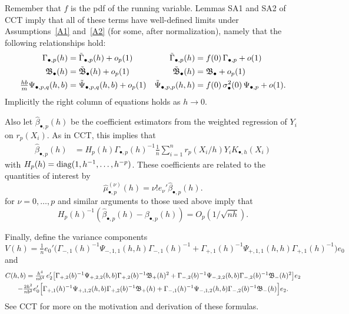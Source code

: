 \documentclass[12pt,fleqn]{article}
\begin{document}
Remember that $f$ is the pdf of the running variable. Lemmas
SA1 and SA2 of CCT imply that all of these terms have well-defined limits under
Assumptions~\ref{A1} and~\ref{A2} (for some, after normalization), namely that
the following relationships hold:
\begin{align}
  \Gamma_{\bullet,p}(h) & = \tilde{\Gamma}_{\bullet,p}(h) + o_p(1) &
  \tilde{\Gamma}_{\bullet,p}(h) &= f(0) \, \Gamma_{\bullet,p} + o(1) \label{eq:10} \\
  \mathfrak{B}_{\bullet}(h) &= \tilde{\mathfrak{B}}_{\bullet}(h) + o_p(1) &
  \tilde{\mathfrak{B}}_{\bullet}(h) &= \mathfrak{B}_{\bullet} + o_p(1) \label{eq:11} \\
  \tfrac{hb}{m} \Psi_{\bullet,p,q}(h, b) &= \tilde{\Psi}_{\bullet,p,q}(h,b) + o_p(1) &
  \tilde{\Psi}_{\bullet,p,p}(h,h) &= f(0) \, \sigma^2_{\bullet}(0) \, \Psi_{\bullet,p} + o(1). \label{eq:12}
\end{align}
Implicitly the right column of equations holds as $h \to 0$.

Also let $\hat\beta_{\bullet,p}(h)$ be the coefficient
estimators from the weighted regression of $Y_i$ on $r_p(X_i)$. As in CCT, this
implies that
\begin{align*}
  \hat\beta_{\bullet,p}(h) &= H_p(h) \Gamma_{\bullet,p}(h)^{-1}
  \tfrac{1}{n} \sum_{i=1}^n r_p(X_i/h) Y_i K_{\bullet,h}(X_i)
\end{align*}
with $H_p(h) = \operatorname{diag}(1, h^{-1}, \dots, h^{-p})$.
These coefficients are related to the quantities of interest by
\begin{equation*}
  \hat{\mu}_{\bullet,p}^{(\nu)}(h) = \nu! e_\nu' \hat\beta_{\bullet,p}(h).
\end{equation*}
for $\nu = 0,\dots,p$ and similar arguments to those used above imply that
\begin{equation*}
  H_p(h)^{-1}(\hat\beta_{\bullet,p}(h) - \beta_{\bullet,p}(h))= O_p(1/\sqrt{nh}).
\end{equation*}

Finally, define the variance components
\begin{equation}\label{eq:8}
  V(h)
  = \tfrac{1}{n} e_0' \big(\Gamma_{-,1}(h)^{-1} \Psi_{-,1,1}(h,h)
    \Gamma_{-,1}(h)^{-1}
  + \Gamma_{+,1}(h)^{-1} \Psi_{+,1,1}(h,h) \Gamma_{+,1}(h)^{-1} \big) e_0
\end{equation}
and
\begin{multline}\label{eq:13}
  C(h,b) =
  \tfrac{h^4}{n b^4} \, e_2' \big[
    \Gamma_{+,2}(b)^{-1} \Psi_{+,2,2}(b,b) \Gamma_{+,2}(b)^{-1} \mathfrak{B}_+(h)^2 +
    \Gamma_{-,2}(b)^{-1} \Psi_{-,2,2}(b,b) \Gamma_{-,2}(b)^{-1} \mathfrak{B}_-(h)^2
  \big] e_2 \\
  - \tfrac{2 h^2}{n b^{2}}
    e_0' \Big[
    \Gamma_{+,1}(h)^{-1} \Psi_{+,1,2}(h,b) \Gamma_{+,2}(b)^{-1} \mathfrak{B}_+(h) +
    \Gamma_{-,1}(h)^{-1} \Psi_{-,1,2}(h,b) \Gamma_{-,2}(b)^{-1} \mathfrak{B}_-(h)
    \Big] e_2.
\end{multline}
See CCT for more on the motivation and derivation of these formulas.
\end{document}
